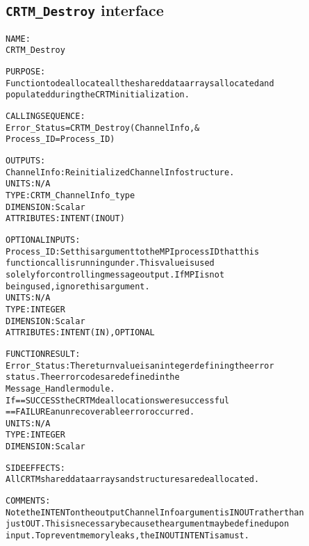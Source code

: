 \subsection{\texttt{CRTM\_Destroy} interface}
  \label{sec:CRTM_Destroy_interface}
  \begin{alltt}
 
  NAME:
        CRTM_Destroy
 
  PURPOSE:
        Function to deallocate all the shared data arrays allocated and
        populated during the CRTM initialization.
 
  CALLING SEQUENCE:
        Error_Status = CRTM_Destroy( ChannelInfo            , &
                                     Process_ID = Process_ID  )
 
  OUTPUTS:
        ChannelInfo:  Reinitialized ChannelInfo structure.
                      UNITS:      N/A
                      TYPE:       CRTM_ChannelInfo_type
                      DIMENSION:  Scalar
                      ATTRIBUTES: INTENT(IN OUT)
 
  OPTIONAL INPUTS:
        Process_ID:   Set this argument to the MPI process ID that this
                      function call is running under. This value is used
                      solely for controlling message output. If MPI is not
                      being used, ignore this argument.
                      UNITS:      N/A
                      TYPE:       INTEGER
                      DIMENSION:  Scalar
                      ATTRIBUTES: INTENT(IN), OPTIONAL
 
  FUNCTION RESULT:
        Error_Status: The return value is an integer defining the error
                      status. The error codes are defined in the
                      Message_Handler module.
                      If == SUCCESS the CRTM deallocations were successful
                         == FAILURE an unrecoverable error occurred.
                      UNITS:      N/A
                      TYPE:       INTEGER
                      DIMENSION:  Scalar
 
  SIDE EFFECTS:
        All CRTM shared data arrays and structures are deallocated.
 
  COMMENTS:
        Note the INTENT on the output ChannelInfo argument is IN OUT rather than
        just OUT. This is necessary because the argument may be defined upon
        input. To prevent memory leaks, the IN OUT INTENT is a must.
 
  \end{alltt}
